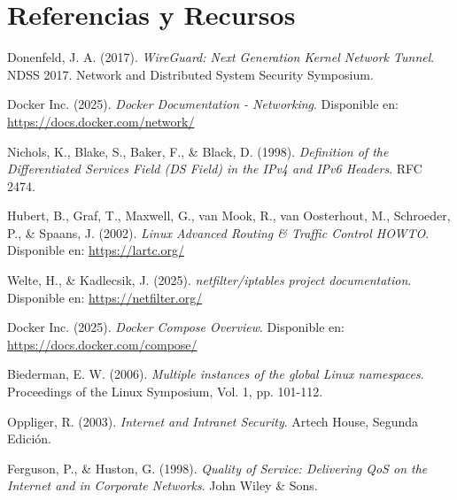 \section{Referencias y Recursos}

\begin{thebibliography}{9}

Donenfeld, J. A. (2017). 
\textit{WireGuard: Next Generation Kernel Network Tunnel}. 
NDSS 2017. Network and Distributed System Security Symposium.

Docker Inc. (2025). 
\textit{Docker Documentation - Networking}. 
Disponible en: \url{https://docs.docker.com/network/}

Nichols, K., Blake, S., Baker, F., \& Black, D. (1998). 
\textit{Definition of the Differentiated Services Field (DS Field) in the IPv4 and IPv6 Headers}. 
RFC 2474.

Hubert, B., Graf, T., Maxwell, G., van Mook, R., van Oosterhout, M., Schroeder, P., \& Spaans, J. (2002). 
\textit{Linux Advanced Routing \& Traffic Control HOWTO}. 
Disponible en: \url{https://lartc.org/}

Welte, H., \& Kadlecsik, J. (2025). 
\textit{netfilter/iptables project documentation}. 
Disponible en: \url{https://netfilter.org/}

Docker Inc. (2025). 
\textit{Docker Compose Overview}. 
Disponible en: \url{https://docs.docker.com/compose/}

Biederman, E. W. (2006). 
\textit{Multiple instances of the global Linux namespaces}. 
Proceedings of the Linux Symposium, Vol. 1, pp. 101-112.

Oppliger, R. (2003). 
\textit{Internet and Intranet Security}. 
Artech House, Segunda Edición.

Ferguson, P., \& Huston, G. (1998). 
\textit{Quality of Service: Delivering QoS on the Internet and in Corporate Networks}. 
John Wiley \& Sons.

\end{thebibliography}
